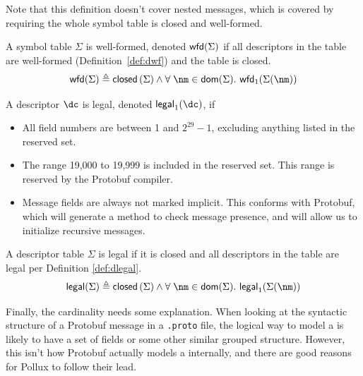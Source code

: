 Note that this definition doesn't cover nested messages, which is covered by
requiring the whole symbol table is closed and well-formed.

\vspace{1em}
\begin{definition}\label{def:sym-wf}
   A symbol table $\Sigma$ is well-formed, denoted $\mathsf{wfd}(\Sigma)$ if all descriptors in
   the table are well-formed (Definition~\ref{def:dwf}) and the table is closed.
   \[ \wft{\Sigma} \triangleq \closed{\Sigma} \wedge \forall\;\nm \in \dom{\Sigma}.\ \wfd{\Sigma(\nm)} \]
\end{definition}

\vspace{1em}
\begin{definition}\label{def:dlegal}
  A descriptor $\dc$ is legal, denoted $\legald{\dc}$, if
  \begin{itemize}
  \item All field numbers are between 1 and $2^{29}-1$, excluding anything
    listed in the reserved set.
  \item The range 19,000 to 19,999 is included in the reserved set. This range
    is reserved by the Protobuf compiler.
  \item Message fields are always not marked implicit. This conforms
    with Protobuf, which will generate a method to check message presence, and
    will allow us to initialize recursive messages.
  \end{itemize}
\end{definition}

\vspace{1em}
\begin{definition}\label{def:sym-legal}
  A descriptor table $\Sigma$ is legal if it is closed and all descriptors in the
  table are legal per Definition \ref{def:dlegal}. 
  \[ \legalt{\Sigma} \triangleq \closed{\Sigma} \wedge \forall\;\nm \in \dom{\Sigma}.\ \legald{\Sigma(\nm)} \]
\end{definition}

Finally, the \Oneof{} cardinality needs some explanation. When looking at
the syntactic structure of a Protobuf message in a \texttt{.proto} file, the
logical way to model a \Oneof{} is likely to have a set of fields or some
other similar grouped structure. However, this isn't how Protobuf actually
models a \Oneof{} internally, and there are good reasons for Pollux to
follow their lead. 

